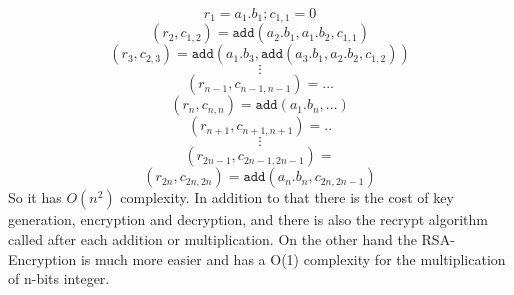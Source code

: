 \documentclass{acm_proc_article-sp}
\begin{document}
\[r_1= a_1.b_1 ; c_{1,1}=0\] 
\[(r_2,c_{1,2})=\texttt{add}(a_2.b_1 ,a_1.b_2 ,c_{1,1}  ) \] 
\[(r_3,c_{2,3})=\texttt{add}(a_1.b_3,\texttt{add}( a_3.b_1, a_2.b_2 , c_{1,2} ))   \] 
 \[ \vdots    \] 
\[ (r_{n-1},c_{n-1,n-1})= ...    \] 
\[(r_{n},c_{n,n})=\texttt{add}(a_1.b_n, ...)      \] 
\[  (r_{n+1},c_{n+1,n+1})= ..   \] 
\[  \vdots      \] 
\[  (r_{2n-1},c_{2n-1,2n-1})=     \] 
\[ (r_{2n},c_{2n,2n})=  \texttt{add}(a_n.b_n, c_{2n,2n-1})    \]
So it has $O(n^{2})$ complexity. In addition to that there is the cost of key generation, encryption and decryption, and there is also the recrypt algorithm called after each addition or multiplication. On the other hand the RSA-Encryption is much more easier and has a O(1) complexity for the multiplication of n-bits integer.
\\\\\\\\\\\\\\\\\\\\\\\\\\\\\\\\\\\\\\\\\\\\\\\\\\
\\\\\\\\\\\\\\\\\\\\\\\\\\\\\\\\\\\\\\\\\\\\\\\\
\end{document}
